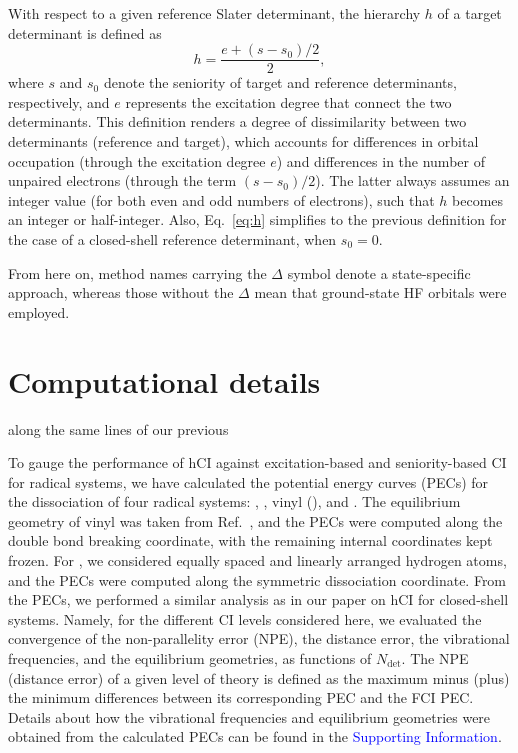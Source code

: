 \documentclass[aip,jcp,reprint,noshowkeys,superscriptaddress]{revtex4-1}
\newcommand{\SupInf}{\textcolor{blue}{Supporting Information}}
\newcommand{\Ndet}{N_\text{det}}
\begin{document}
With respect to a given reference Slater determinant, the hierarchy $h$ of a target determinant is defined as
\begin{equation}
        \label{eq:h}
	h = \frac{e+ (s-s_0)/2}{2},
\end{equation}
where $s$ and $s_0$ denote the seniority of target and reference determinants, respectively, and $e$ represents the excitation degree that connect the two determinants.
This definition renders a degree of dissimilarity between two determinants (reference and target),
which accounts for differences in orbital occupation (through the excitation degree $e$)
and differences in the number of unpaired electrons (through the term $(s-s_0)/2$).
The latter always assumes an integer value (for both even and odd numbers of electrons), such that $h$ becomes an integer or half-integer.
Also, Eq.~\eqref{eq:h} simplifies to the previous definition \cite{Kossoski_2022} for the case of a closed-shell reference determinant, when $s_0 = 0$.

From here on, method names carrying the $\Delta$ symbol denote a state-specific approach,
whereas those without the $\Delta$ mean that ground-state HF orbitals were employed.


\section{Computational details}
\label{sec:compdet}
along the same lines of our previous 

To gauge the performance of hCI against excitation-based and seniority-based CI for radical systems,
we have calculated the potential energy curves (PECs) for the dissociation of four radical systems:
, , vinyl (), and .
The equilibrium geometry of vinyl was taken from Ref.~,
and the PECs were computed along the  double bond breaking coordinate, with the remaining internal coordinates kept frozen.
For , we considered equally spaced and linearly arranged hydrogen atoms, and the PECs were computed along the symmetric dissociation coordinate.
From the PECs, we performed a similar analysis as in our paper on hCI for closed-shell systems. \cite{Kossoski_2022}
Namely, for the different CI levels considered here, 
we evaluated the convergence of the non-parallelity error (NPE), the distance error, the vibrational frequencies, and the equilibrium geometries, as functions of $\Ndet$.
The NPE (distance error) of a given level of theory is defined as the maximum minus (plus) the minimum differences between its corresponding PEC and the FCI PEC.
Details about how the vibrational frequencies and equilibrium geometries were obtained from the calculated PECs can be found in the \SupInf.
\end{document}
